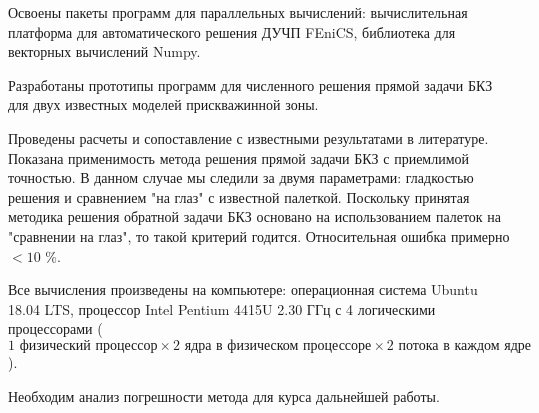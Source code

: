 
Освоены пакеты программ для параллельных вычислений: вычислительная платформа для автоматического решения ДУЧП FEniCS, библиотека для векторных вычислений Numpy.

Разработаны прототипы программ для численного решения прямой задачи БКЗ для двух известных моделей прискважинной зоны.

Проведены расчеты и сопоставление с известными результатами в литературе. Показана применимость метода решения прямой задачи БКЗ с приемлимой точностью. В данном случае мы следили за двумя параметрами: гладкостью решения и сравнением "на глаз" с известной палеткой. Поскольку принятая методика решения обратной задачи БКЗ основано на использованием палеток на "сравнении на глаз", то такой критерий годится. Относительная ошибка примерно ${<10}$ \%.

Все вычисления произведены на компьютере: операционная система Ubuntu 18.04 LTS, процессор Intel Pentium 4415U 2.30 ГГц с 4 логическими процессорами
($1 \text{ физический процессор} \times 2 \text{ ядра в физическом процессоре} \times 2 \text{ потока в каждом ядре}$).

Необходим анализ погрешности метода для курса дальнейшей работы.

\clearpage
